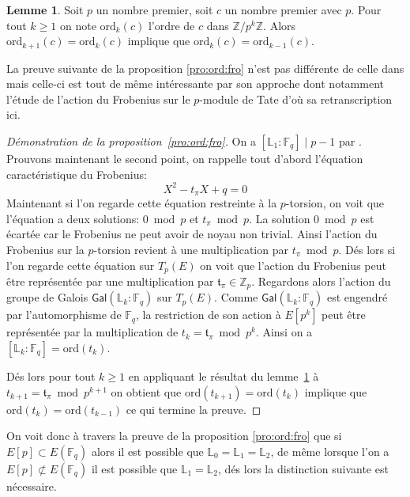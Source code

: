 \documentclass[10pt,a4paper]{book}
\theoremstyle{plain}
\theoremstyle{definition}
\theoremstyle{definition}
\newtheorem{lem}[thm]{Lemme}
\theoremstyle{definition}
\theoremstyle{definition}
\theoremstyle{definition}
\theoremstyle{remark}
\theoremstyle{remark}
\theoremstyle{definition}
\begin{document}
\begin{lem}
\label{lem:ord}
Soit $p$ un nombre premier, soit $c$ un nombre premier avec $p$. Pour tout $k \geqslant 1$ on note $\mathrm{ord}_k(c)$ l'ordre de $c$ dans $\mathbb{Z}/p^k\mathbb{Z}$. Alors $\mathrm{ord}_{k+1}(c)=\mathrm{ord}_k(c)$ implique que $\mathrm{ord}_k(c) = \mathrm{ord}_{k-1}(c)$.
\end{lem}

La preuve suivante de la proposition \ref{pro:ord:fro} n'est pas différente de celle dans \cite[Proposition 5]{DeFeo11} mais celle-ci est tout de même intéressante par son approche dont notamment l'étude de l'action du Frobenius sur le $p$-module de Tate d'où sa retranscription ici.

\begin{proof}[Démonstration de la proposition~\ref{pro:ord:fro}]
On a $[\mathbb{L}_1:\mathbb{F}_q] \mid p-1$ par \cite[Theorem 4]{Gunji76}. Prouvons maintenant le second point,
on rappelle tout d'abord l'équation caractéristique du Frobenius:
\begin{equation*}
X^2 - t_{\pi}X + q = 0
\end{equation*}
Maintenant si l'on regarde cette équation restreinte à la $p$-torsion, on voit 
que l'équation a deux solutions: $0 \bmod p$ et $t_{\pi} \bmod p$. La solution 
$0 \bmod p$ est écartée car le Frobenius ne peut avoir de noyau non trivial. 
Ainsi l'action du Frobenius sur la $p$-torsion revient à une multiplication par
$t_{\pi} \bmod p$. Dés lors si l'on regarde cette équation sur $T_{p}(E)$ on 
voit que l'action du Frobenius peut être représentée par une multiplication par
$\mathfrak{t}_{\pi} \in \mathbb{Z}_{p} $. Regardons alors l'action du groupe de
Galois $\mathsf{Gal}(\mathbb{L}_k:\mathbb{F}_q)$ sur $T_{p}(E)$. Comme 
$\mathsf{Gal}(\mathbb{L}_k:\mathbb{F}_q)$ est engendré par l'automorphisme de 
$\mathbb{F}_q$, la restriction de son action à $E[p^k]$ peut être représentée 
par la multiplication de $t_k=\mathfrak{t}_{\pi}\bmod p^k$. Ainsi on a 
$[\mathbb{L}_k:\mathbb{F}_q]=\mathrm{ord}(t_k)$.

Dés lors pour tout $k\geqslant 1$ en appliquant le résultat du 
lemme~\ref{lem:ord} à $t_{k+1}=\mathfrak{t}_{\pi} \bmod p^{k+1}$ on obtient que
$\mathrm{ord}(t_{k+1})=\mathrm{ord}(t_{k})$ implique que $\mathrm{ord}(t_{k})=
\mathrm{ord}(t_{k-1})$ ce qui termine la preuve.
\end{proof}

On voit donc à travers la preuve de la proposition \ref{pro:ord:fro} que si $E[p] \subset E(\mathbb{F}_q)$ alors il est possible que $\mathbb{L}_0=\mathbb{L}_1=\mathbb{L}_2$, de même lorsque l'on a $E[p] \not\subset E(\mathbb{F}_q)$ il est possible que $\mathbb{L}_1=\mathbb{L}_2$, dés lors la distinction suivante est nécessaire.
\end{document}
